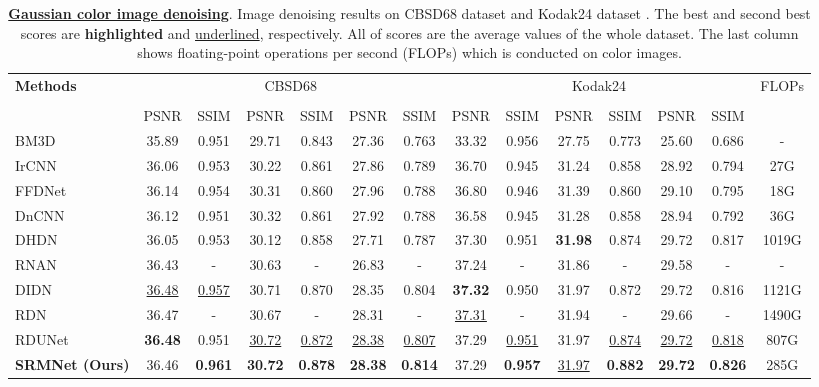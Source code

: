 \documentclass{article}
\begin{document}
\begin{table*}[!t] \footnotesize
\caption{\textbf{\underline{Gaussian color image denoising}}. Image denoising results on CBSD68 dataset \cite{35} and Kodak24 dataset \cite{36}. The best and second best scores are \textbf{highlighted} and \underline{underlined}, respectively. All of scores are the average values of the whole dataset. The last column shows floating-point operations per second (FLOPs) which is conducted on  color images.}
\label{denoise_table}
\begin{center}
\begin{tabular}{l  || cc | cc| cc || cc | cc| cc || c}
\toprule[1.5 pt]\multirow{3}{*}{\textbf{Methods}}&\multicolumn{6}{c||}{CBSD68 \cite{35}}&\multicolumn{6}{c||}{Kodak24 \cite{36}}&\multirow{3}{*}{FLOPs}\\
&\multicolumn{2}{c}{}&\multicolumn{2}{c}{}&\multicolumn{2}{c||}{}&\multicolumn{2}{c}{}&\multicolumn{2}{c}{}&\multicolumn{2}{c||}{}\\
&\multicolumn{1}{c}{PSNR}&\multicolumn{1}{c}{SSIM}&\multicolumn{1}{c}{PSNR}&\multicolumn{1}{c}{SSIM}&\multicolumn{1}{c}{PSNR}&\multicolumn{1}{c||}{SSIM}&\multicolumn{1}{c}{PSNR}&\multicolumn{1}{c}{SSIM}&\multicolumn{1}{c}{PSNR}&\multicolumn{1}{c}{SSIM}&\multicolumn{1}{c}{PSNR}&\multicolumn{1}{c||}{SSIM}\\
\midrule[1.5 pt]
BM3D \cite{01}
&35.89&0.951&29.71&0.843&27.36&0.763&33.32&0.956&27.75&0.773&25.60&0.686&-\\
IrCNN \cite{17}
&36.06&0.953&30.22&0.861&27.86&0.789&36.70&0.945&31.24&0.858&28.92&0.794&27G\\
FFDNet \cite{16}
&36.14&0.954&30.31&0.860&27.96&0.788&36.80&0.946&31.39&0.860&29.10&0.795&18G\\	
DnCNN \cite{04}
&36.12&0.951&30.32&0.861&27.92&0.788&36.58&0.945&31.28&0.858&28.94&0.792&36G\\
DHDN \cite{14}
&36.05&0.953&30.12&0.858&27.71&0.787&37.30&0.951&\textbf{31.98}&0.874&29.72&0.817&1019G\\
RNAN \cite{11}
&36.43&-&30.63&-&26.83&-&37.24&-&31.86&-&29.58&-&-\\
DIDN \cite{44}
&\underline{36.48}&\underline{0.957}&30.71&0.870&28.35&0.804&\textbf{37.32}&0.950&31.97&0.872&29.72&0.816&1121G\\
RDN \cite{07}&36.47&-&30.67&-&28.31&-&\underline{37.31}&-&31.94&-&29.66&-&1490G\\
RDUNet \cite{15}
&\textbf{36.48}&0.951&\underline{30.72}&\underline{0.872}&\underline{28.38}&\underline{0.807}&37.29&\underline{0.951}&31.97&\underline{0.874}&\underline{29.72}&\underline{0.818}&807G\\
\midrule[1.5 pt]
\textbf{SRMNet (Ours)}
&36.46&\textbf{0.961}&\textbf{30.72}&\textbf{0.878}&\textbf{28.38}&\textbf{0.814}&37.29&\textbf{0.957}&\underline{31.97}&\textbf{0.882}&\textbf{29.72}&\textbf{0.826}&285G\\
\bottomrule[1.5pt]
\end{tabular}
\end{center}
\end{table*}
\end{document}
